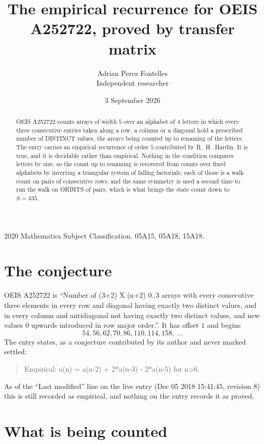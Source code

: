 \documentclass[11pt,a4paper]{article}
\title{The empirical recurrence for OEIS A252722, proved by transfer matrix}
\author{Adrian Perez Fontelles\\ \small Independent researcher}
\date{3 September 2026}
\theoremstyle{plain}
\theoremstyle{definition}
\begin{document}
\maketitle

\begin{abstract}
OEIS A252722 counts arrays of width $5$ over an alphabet of $4$ letters in which every three
consecutive entries taken along a row, a column or a diagonal hold a prescribed number of
DISTINCT values, the arrays being counted up to renaming of the letters. The entry carries an
empirical recurrence of order $5$ contributed by R.~H.~Hardin. It is true, and it is
decidable rather than empirical. Nothing in the condition compares letters by size, so the
count up to renaming is recovered from counts over fixed alphabets by inverting a triangular
system of falling factorials; each of those is a walk count on pairs of consecutive rows, and
the same symmetry is used a second time to run the walk on ORBITS of pairs, which is what
brings the state count down to $S=435$.
\end{abstract}

\noindent\small 2020 Mathematics Subject Classification. 05A15, 05A18, 15A18.\normalsize

\section{The conjecture}

OEIS A252722 is ``Number of (3+2) X (n+2) 0..3 arrays with every consecutive three elements in every row and diagonal having exactly two distinct values, and in every column and antidiagonal not having exactly two distinct values, and new values 0 upwards introduced in row major order.''. It has offset $1$ and begins
\[
54, 56, 62, 70, 86, 110, 114, 158,\ \dots
\]
The entry states, as a conjecture contributed by its author and never marked settled:
\begin{quote}
Empirical: a(n) = a(n-2) + 2*a(n-3) - 2*a(n-5) for n>6.
\end{quote}
As of the ``Last modified'' line on the live entry (Dec 05 2018 15:41:45, revision 8) this is still
recorded as empirical, and nothing on the entry records it as proved.

\section{What is being counted}
\end{document}
